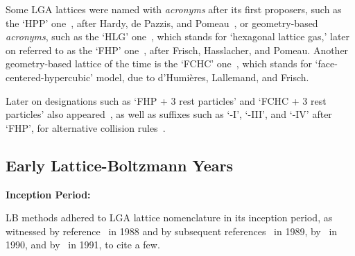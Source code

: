     Some  LGA  lattices   were   named   with   \emph{ac\-ro\-nyms}   after   its   first   proposers,   such   as   the   `HPP'
    one~\cite{1986-FrischU+PomeauY-PhysRevLett},  after  Hardy,  de  Pazzis,   and   Pomeau~\cite{1973-HardyJ+PazzisO-JMathPhys,
    1976-HardyJ+PomeauY-PhysRevA,  1987-SucciS-JPhysAMathGen},  or  geometry-based  \emph{ac\-ro\-nyms},  such  as   the   `HLG'
    one~\cite{1986-FrischU+PomeauY-PhysRevLett}, which stands for `hexagonal lattice gas,' later on referred  to  as  the  `FHP'
    one~\cite{1987-FrischU+RivetJP-ComplexSyst,  1987-SucciS-JPhysAMathGen},  after  Frisch,  Hasslacher,  and  Pomeau.  Another
    geometry-based  lattice  of  the  time  is  the  `FCHC'  one~\cite{1987-FrischU+RivetJP-ComplexSyst},   which   stands   for
    `face-centered-hypercubic' model, due to d'Hu\-mi\-è\-res, Lallemand, and Frisch.

    Later on designations such as `FHP + 3 rest particles' and `FCHC + 3 rest particles' also appeared~\cite{1991-BoonJP-PhysD},
    as   well   as   suffixes   such   as   `-I',   `-III',   and    `-IV'    after    `FHP',    for    alternative    collision
    rules~\cite{1991-AppertC+ZaleskiS-PhysD, 1991-BoonJP-PhysD, 1991-ChenS+RoseH-PhysD}.

    \subsection{Early Lattice-Boltzmann Years}


    \vspace{2.0mm}\noindent\textbf{Inception Period:}\vspace{1.0mm}

    LB   methods   adhered    to    LGA    lattice    nomenclature    in    its    inception    period,    as    witnessed    by
    reference~\cite{1988-McNamaraGR+ZanettiG-PhysRevLett}          in          1988          and          by          subsequent
    references~\cite{1989-HigueraFJ+JimenezJ-EuroPhysLett,         1989-HigueraFJ+SucciS-EuroPhysLett}         in          1989,
    by~\cite{1990-BenziR+VergassolaM-EuroPhysLett,   1990-BenziR+VergassolaM-NuclPhysB,    1990-CancelliereA+SucciS-PhysFluidsA,
    1990-VergassolaM+SucciS-EuroPhysLett}   in   1990,   and   by~\cite{1991-CornubertR+LevermoreD-PhysD,    1991-ErnstMH-PhysD,
    1991-FrischU-PhysD, 1991-GunstensenAK+ZanettiG-PhysRevA, 1991-SucciS+BenziR-PhysRevA} in 1991, to cite a few.


